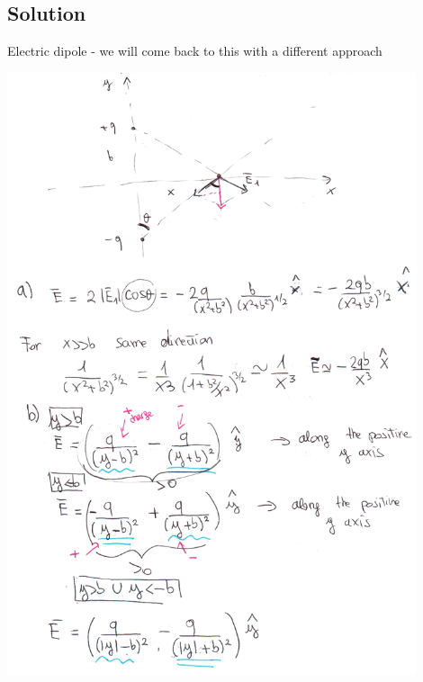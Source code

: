 \documentclass[solutions]{esg8022pset}
\begin{document}
\subsection{Solution}
  Electric dipole - we will come back to this with a different approach
  \begin{center}\includegraphics[width=0.9\textwidth]{ps01_sol_07_1}\end{center}
\end{document}
